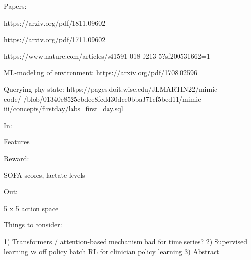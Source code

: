 \documentclass{article}
\begin{document}
Papers:

https://arxiv.org/pdf/1811.09602

https://arxiv.org/pdf/1711.09602

https://www.nature.com/articles/s41591-018-0213-5?sf200531662=1

ML-modeling of environment: https://arxiv.org/pdf/1708.02596

Querying phy state: https://pages.doit.wisc.edu/JLMARTIN22/mimic-code/-/blob/01340e8525cbdee8fcdd30dce0bba371cf5bed11/mimic-iii/concepts/firstday/labs_first_day.sql

In:

Features

Reward:

SOFA scores, lactate levels

Out:

5 x 5 action space

Things to consider:

1) Transformers / attention-based mechanism bad for time series?
2) Supervised learning vs off policy batch RL for clinician policy learning
3) Abstract
\end{document}
